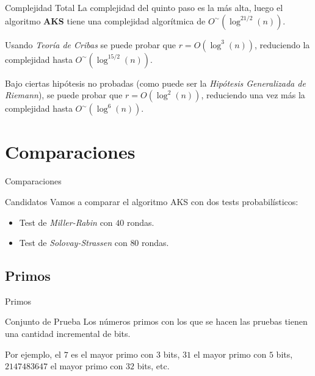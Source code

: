\documentclass{beamer}
\begin{document}
\begin{frame}{Complejidad Total}
	\onslide<1->La complejidad del quinto paso es la más alta, luego el algoritmo \textbf{AKS} tiene una complejidad algorítmica de $O^\sim(\log^{21/2}(n))$.\break
	
	Usando \textit{Teoría de Cribas} se puede probar que $r = O(\log^3(n))$, reduciendo la complejidad hasta $O^\sim(\log^{15/2}(n))$.\break
	
	Bajo ciertas hipótesis no probadas (como puede ser la \textit{Hipótesis Generalizada de Riemann}), se puede probar que $r = O(\log^2(n))$, reduciendo una vez más la complejidad hasta $O^\sim(\log^6(n))$.
\end{frame}

\section{Comparaciones}

\begin{frame}
	\centering
	\begin{Huge}
		Comparaciones
	\end{Huge}
\end{frame}

\begin{frame}{Candidatos}
	\onslide<1->Vamos a comparar el algoritmo AKS con dos tests probabilísticos:\break
	
	\begin{itemize}[<+(1)->]
		\item Test de \textit{Miller-Rabin} con $40$ rondas.
		
		\item Test de \textit{Solovay-Strassen} con $80$ rondas.
	\end{itemize}
\end{frame}

\subsection{Primos}

\begin{frame}
	\centering
	\begin{Large}
		Primos
	\end{Large}
\end{frame}

\begin{frame}{Conjunto de Prueba}
	Los números primos con los que se hacen las pruebas tienen una cantidad incremental de bits.\break
	
	Por ejemplo, el $7$ es el mayor primo con $3$ bits, $31$ el mayor primo con $5$ bits, $2147483647$ el mayor primo con $32$ bits, etc.\break
\end{frame}
\end{document}
